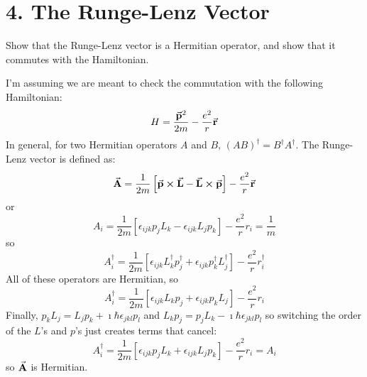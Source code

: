 \documentclass[a4paper,twoside]{article}
\begin{document}
\section*{4. The Runge-Lenz Vector}
Show that the Runge-Lenz vector is a Hermitian operator, and show that it commutes with the Hamiltonian.
\begin{problem}
    I'm assuming we are meant to check the commutation with the following Hamiltonian:
    \begin{equation}
        H = \frac{\va{p}^2}{2m} - \frac{e^2}{r}\va{r}
    \end{equation}
    In general, for two Hermitian operators $ A $ and $ B $, $ (AB)^\dagger = B^\dagger A^\dagger $. The Runge-Lenz vector is defined as:
    \begin{equation}
        \va{A} = \frac{1}{2m} \left[ \va{p} \cross \va{L} - \va{L} \cross \va{p} \right] - \frac{e^2}{r} \va{r}
    \end{equation}
    or
    \begin{equation}
        A_i = \frac{1}{2m} \left[ \epsilon_{ijk} p_j L_k - \epsilon_{ijk} L_j p_k\right] - \frac{e^2}{r} r_i = \frac{1}{m} 
    \end{equation}
    so
    \begin{equation}
        A_i^\dagger = \frac{1}{2m} \left[ \epsilon_{ijk} L_k^\dagger p_j^\dagger + \epsilon_{ijk} p_k^\dagger L_j^\dagger \right] - \frac{e^2}{r} r_i^\dagger 
    \end{equation}
    All of these operators are Hermitian, so
    \begin{equation}
        A_i^\dagger = \frac{1}{2m} \left[ \epsilon_{ijk} L_k p_j + \epsilon_{ijk} p_k L_j \right] - \frac{e^2}{r} r_i
    \end{equation}
    Finally, $ p_k L_j = L_j p_k + \imath \hbar \epsilon_{jkl} p_l $ and $ L_k p_j = p_j L_k - \imath \hbar \epsilon_{jkl} p_l $ so switching the order of the $ L $'s and $ p $'s just creates terms that cancel:
    \begin{equation}
        A_i^\dagger = \frac{1}{2m} \left[ \epsilon_{ijk} p_j L_k + \epsilon_{ijk} L_j p_k \right] - \frac{e^2}{r} r_i = A_i
    \end{equation}
    so $ \va{A} $ is Hermitian.


\end{problem}
\end{document}
